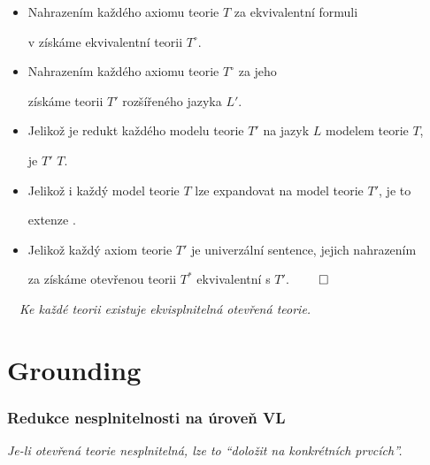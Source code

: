     \begin{itemize}
    \item Nahrazením každého axiomu teorie $T$ za ekvivalentní formuli
    \vspace{0.5mm}
    
    v  získáme ekvivalentní teorii $T^\circ$.
    \vspace{0.5mm}
    
    \item Nahrazením každého axiomu teorie $T^\circ$ za jeho 
    \vspace{0.5mm}
    
    získáme teorii $T'$ rozšířeného jazyka $L'$.
    \vspace{0.5mm}
    
    \item Jelikož je redukt každého modelu teorie $T'$ na jazyk $L$ modelem teorie $T$,
    \vspace{0.5mm}
    
    je $T'$  $T$.
    \vspace{0.5mm}
    
    \item Jelikož i každý model teorie $T$ lze expandovat na model teorie $T'$, je to
    \vspace{0.5mm}
    
    extenze .
    \vspace{0.5mm}
    
    \item Jelikož každý axiom teorie $T'$ je univerzální sentence, jejich nahrazením
    \vspace{0.5mm}
    
    za  získáme otevřenou teorii $T^*$ ekvivalentní s $T'$. $\qed$
    \end{itemize}
    \medskip
    
    {\bf {}}\ \ {\it Ke každé teorii existuje ekvisplnitelná otevřená teorie.}
    
    


\section{Grounding}\label{section:grounding}
\todo

\subsubsection*{Redukce nesplnitelnosti na úroveň VL}
    {\it Je-li otevřená teorie nesplnitelná, lze to ``doložit na konkrétních prvcích''.}
    \medskip
    
